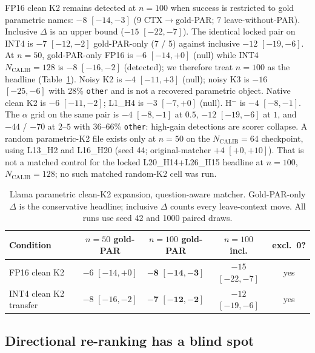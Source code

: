 \documentclass{article} %
\begin{document}
FP16 clean K2 remains detected at $n{=}100$ when success is restricted to gold parametric names: $-8$ $[-14,-3]$ (9 CTX$\to$gold-PAR; 7 leave-without-PAR). Inclusive $\Delta$ is an upper bound ($-15$ $[-22,-7]$). The identical locked pair on INT4 is $-7$ $[-12,-2]$ gold-PAR-only (7 / 5) against inclusive $-12$ $[-19,-6]$. At $n{=}50$, gold-PAR-only FP16 is $-6$ $[-14,+0]$ (null) while INT4 $N_{\mathrm{CALIB}}{=}128$ is $-8$ $[-16,-2]$ (detected); we therefore treat $n{=}100$ as the headline (Table~\ref{tab:parametric-n50-n100}). Noisy K2 is $-4$ $[-11,+3]$ (null); noisy K3 is $-16$ $[-25,-6]$ with 28\% \texttt{other} and is not a recovered parametric object. Native clean K2 is $-6$ $[-11,-2]$; L1\_H4 is $-3$ $[-7,+0]$ (null). H$^-$ is $-4$ $[-8,-1]$. The $\alpha$ grid on the same pair is $-4$ $[-8,-1]$ at $0.5$, $-12$ $[-19,-6]$ at $1$, and $-44$ / $-70$ at $2$--$5$ with 36--66\% \texttt{other}: high-gain detections are scorer collapse. A random parametric-K2 file exists only at $n{=}50$ on the $N_{\mathrm{CALIB}}{=}64$ checkpoint, using L13\_H2 and L16\_H20 (seed 44; original-matcher $+4$ $[+0,+10]$). That is not a matched control for the locked L20\_H14+L26\_H15 headline at $n{=}100$, $N_{\mathrm{CALIB}}{=}128$; no such matched random-K2 cell was run.

\begin{table}[t]
\caption{Llama parametric clean-K2 expansion, question-aware matcher. Gold-PAR-only $\Delta$ is the conservative headline; inclusive $\Delta$ counts every leave-context move. All runs use seed 42 and 1000 paired draws.}
\label{tab:parametric-n50-n100}
\centering
\scriptsize
\setlength{\tabcolsep}{2pt}
\begin{tabular}{lcccc}
\toprule
Condition & $n{=}50$ gold-PAR & $n{=}100$ gold-PAR & $n{=}100$ incl. & excl.\ 0? \\
\midrule
FP16 clean K2 & $-6$ $[-14,+0]$ & $\mathbf{-8}$ $\mathbf{[-14,-3]}$ & $-15$ $[-22,-7]$ & yes \\
INT4 clean K2 transfer & $-8$ $[-16,-2]$ & $\mathbf{-7}$ $\mathbf{[-12,-2]}$ & $-12$ $[-19,-6]$ & yes \\
\bottomrule
\end{tabular}
\end{table}

\subsection{Directional re-ranking has a blind spot}
\label{sec:blindspot}
\end{document}
